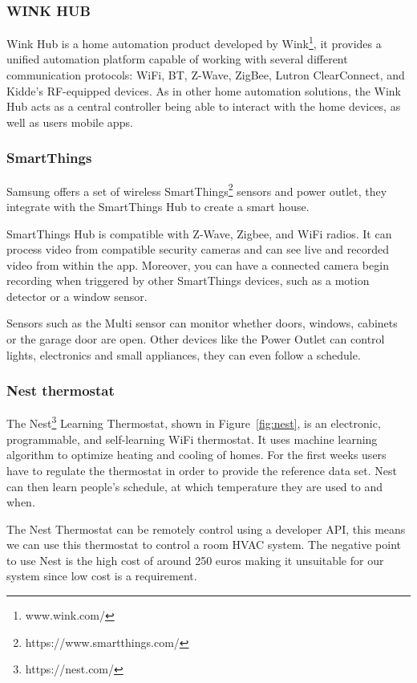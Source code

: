 \subsubsection{WINK HUB}

Wink Hub is a home automation product developed by Wink\footnote{www.wink.com/}, it provides a unified automation platform capable of working with several different communication protocols: \ac{WiFi}, \ac{BT}, Z-Wave, ZigBee, Lutron ClearConnect, and Kidde's RF-equipped devices.
As in other home automation solutions, the Wink Hub acts as a central controller being able to interact with the home devices, as well as users mobile apps.

\subsubsection{SmartThings}

Samsung offers a set of wireless SmartThings\footnote{https://www.smartthings.com/} sensors and power outlet, they integrate with the SmartThings Hub to create a smart house.

SmartThings Hub is compatible with Z-Wave, Zigbee, and \ac{WiFi} radios. It can process video from compatible security cameras and can see live and recorded video from within the app. Moreover, you can have a connected camera begin recording when triggered by other SmartThings devices, such as a motion detector or a window sensor. 


Sensors such as the Multi sensor can monitor whether doors, windows, cabinets or the garage door are open. Other devices like the Power Outlet can control lights, electronics and small appliances, they can even follow a schedule.




\subsubsection{Nest thermostat}

The Nest\footnote{https://nest.com/} Learning Thermostat, shown in Figure~\ref{fig:nest}, is an electronic, programmable, and self-learning \ac{WiFi} thermostat. It uses machine learning algorithm to optimize  heating and cooling of homes. For the first weeks users have to regulate the thermostat in order to provide the reference data set. Nest can then learn people's schedule, at which temperature they are used to and when. 

The Nest Thermostat can be remotely control using a developer \ac{API}, this means we can use this thermostat to control a room \ac{HVAC} system. The negative point to use Nest is the high cost of around 250 euros making it unsuitable for our system since low cost is a requirement. 

